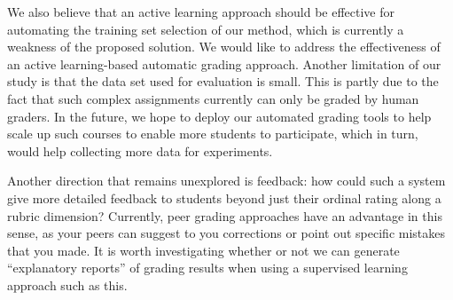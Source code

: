 We also believe that an active learning approach should be effective for
automating the training set selection of our method, which is currently a
weakness of the proposed solution. We would like to address the
effectiveness of an active learning-based automatic grading approach.
Another limitation of our study is that the data set used for evaluation is small. 
This is partly due to the fact that such complex assignments currently can only be graded
by human graders. In the future, we hope to deploy our automated grading tools
to help scale up such courses to enable more students to participate, which in turn, would
help collecting more data for experiments. 

Another direction that remains unexplored is feedback: how could such a
system give more detailed feedback to students beyond just their ordinal
rating along a rubric dimension? Currently, peer grading approaches have
an advantage in this sense, as your peers can suggest to you corrections
or point out specific mistakes that you made. It is worth investigating
whether or not we can generate ``explanatory reports'' of grading results
when using a supervised learning approach such as this.
